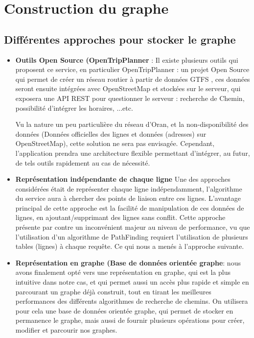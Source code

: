 	
\section{Construction du graphe}
\subsection{Différentes approches pour stocker le graphe}
\begin{itemize}
	\item \textbf{Outils Open Source (OpenTripPlanner} : 
	      Il existe plusieurs outils qui proposent ce service, en particulier OpenTripPlanner : un projet Open Source qui permet de créer un réseau routier à partir de données GTFS , ces données seront ensuite intégrées avec OpenStreetMap et stockées sur le serveur, qui exposera une API REST pour questionner le serveur : recherche de Chemin, possibilité d'intégrer les horaires, ...etc.
	      		
	      Vu la nature un peu particulière du réseau d'Oran, et la non-disponibilité des données (Données officielles des lignes et données (adresses) sur OpenStreetMap), cette solution ne sera pas envisagée. 
	      Cependant, l'application prendra une architecture flexible permettant d'intégrer, au futur, de tels outils rapidement au cas de nécessité.
	\item \textbf{Représentation indépendante de chaque ligne}
	      Une des approches considérées était de représenter chaque ligne indépendamment, l'algorithme du service aura à chercher des points de liaison entre ces lignes.
	      L'avantage principal de cette approche est la facilité de manipulation de ces données de lignes, en ajoutant/supprimant des lignes sans conflit.
	      Cette approche présente par contre un inconvénient majeur au niveau de performance, vu que l'utilisation d'un algorithme de PathFinding requiert l'utilisation de plusieurs tables (lignes) à chaque requête. Ce qui nous a menés à l'approche suivante.
	\item \textbf{Représentation en graphe (Base de données orientée graphe}: nous avons finalement opté vers une représentation en graphe, qui est la plus intuitive dans notre cas, et qui permet aussi un accès plus rapide et simple en parcourant un graphe déjà construit, tout en tirant les meilleures performances des différents algorithmes de recherche de chemins.
	On utilisera pour cela une base de données orientée graphe, qui permet de stocker en permanence le graphe, mais aussi de fournir plusieurs opérations pour créer, modifier et parcourir nos graphes.
	

\end{itemize}
